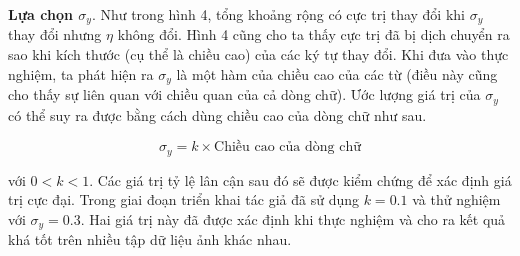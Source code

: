\documentclass[12pt, a4paper]{article}
\begin{document}
\textbf{Lựa chọn $\sigma_y$}. Như trong hình 4, tổng khoảng rộng có cực trị thay đổi khi $\sigma_y$ thay đổi nhưng $\eta$ không đổi. Hình 4 cũng cho ta thấy cực trị đã bị dịch chuyển ra sao khi kích thước (cụ thể là chiều cao) của các ký tự thay đổi. Khi đưa vào thực nghiệm, ta phát hiện ra $\sigma_y$ là một hàm của chiều cao của các từ (điều này cũng cho thấy sự liên quan với chiều quan của cả dòng chữ). Ước lượng giá trị của $\sigma_y$ có thể suy ra được bằng cách dùng chiều cao của dòng chữ như sau.

\begin{equation}
\sigma_y = k \times \text{Chiều cao của dòng chữ}
\end{equation}

với $0 < k < 1$. Các giá trị tỷ lệ lân cận sau đó sẽ được kiểm chứng để xác định giá trị cực đại. Trong giai đoạn triển khai tác giả đã sử dụng $k = 0.1$ và thử nghiệm với $\sigma_y = 0.3$. Hai giá trị này đã được xác định khi thực nghiệm và cho ra kết quả khá tốt trên nhiều tập dữ liệu ảnh khác nhau.
\end{document}
